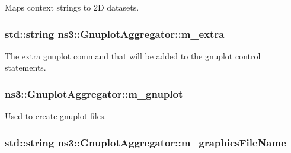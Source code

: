 Maps context strings to 2D datasets. 

\subsubsection[{\texorpdfstring{m\+\_\+extra}{m_extra}}]{\setlength{\rightskip}{0pt plus 5cm}std\+::string ns3\+::\+Gnuplot\+Aggregator\+::m\+\_\+extra\hspace{0.3cm}{\ttfamily [private]}}\hypertarget{classns3_1_1GnuplotAggregator_a84892f8648179f98a31a9a1a5c641938}{}\label{classns3_1_1GnuplotAggregator_a84892f8648179f98a31a9a1a5c641938}
The extra gnuplot command that will be added to the gnuplot control statements. 
\subsubsection[{\texorpdfstring{m\+\_\+gnuplot}{m_gnuplot}}]{ ns3\+::\+Gnuplot\+Aggregator\+::m\+\_\+gnuplot\hspace{0.3cm}{\ttfamily [private]}}\hypertarget{classns3_1_1GnuplotAggregator_a152975e86bbfbc344ff39d8917a9190f}{}\label{classns3_1_1GnuplotAggregator_a152975e86bbfbc344ff39d8917a9190f}


Used to create gnuplot files. 

\subsubsection[{\texorpdfstring{m\+\_\+graphics\+File\+Name}{m_graphicsFileName}}]{\setlength{\rightskip}{0pt plus 5cm}std\+::string ns3\+::\+Gnuplot\+Aggregator\+::m\+\_\+graphics\+File\+Name\hspace{0.3cm}{\ttfamily [private]}}\hypertarget{classns3_1_1GnuplotAggregator_a1c71e8a1f4b1b2ff4d2802a257e26e2a}{}\label{classns3_1_1GnuplotAggregator_a1c71e8a1f4b1b2ff4d2802a257e26e2a}


